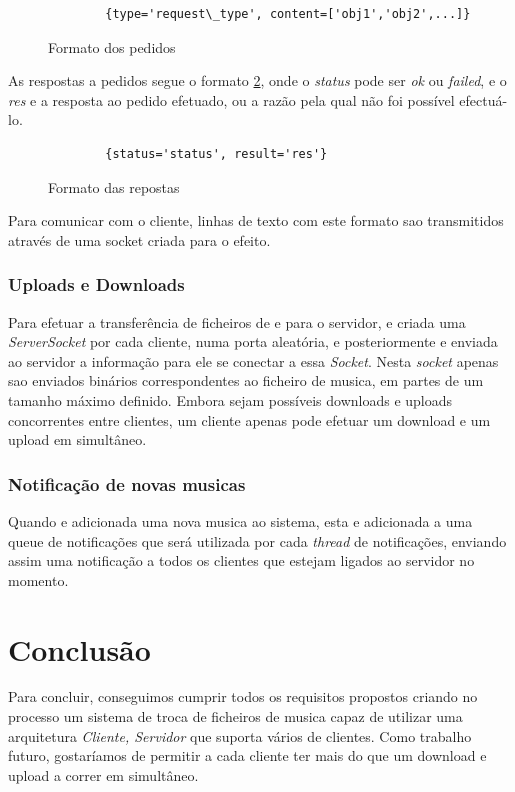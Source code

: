 \documentclass[a4paper]{report}
\begin{document}
\begin{figure}[H]
    \begin{verbatim}
        {type='request\_type', content=['obj1','obj2',...]}
    \end{verbatim}
    \caption{Formato dos pedidos}
    \label{inputformat}
\end{figure}
As respostas a pedidos segue o formato \ref{outputformat}, onde o 
\textit{status} pode ser \textit{ok} ou \textit{failed}, e o \textit{res}
e a resposta ao pedido efetuado, ou a razão pela qual não foi possível 
efectuá-lo.

\begin{figure}[H]
    \begin{verbatim}
        {status='status', result='res'}
    \end{verbatim}
    \caption{Formato das repostas}
    \label{outputformat}
\end{figure}
Para comunicar com o cliente, linhas de texto com este formato sao transmitidos
através de uma socket criada para o efeito.

\subsection{Uploads e Downloads}
Para efetuar a transferência de ficheiros de e para o servidor, e criada uma
\textit{ServerSocket} por cada cliente, numa porta aleatória, e posteriormente
e enviada ao servidor a informação para ele se conectar a essa \textit{Socket}.
Nesta \textit{socket} apenas sao enviados binários correspondentes ao ficheiro
de musica, em partes de um tamanho máximo definido. Embora sejam possíveis
downloads e uploads concorrentes entre clientes, um cliente apenas pode efetuar
um download e um upload em simultâneo.

\subsection{Notificação de novas musicas}
Quando e adicionada uma nova musica ao sistema, esta e adicionada a uma queue de
notificações que será utilizada por cada \textit{thread} de notificações, 
enviando assim uma notificação a todos os clientes que estejam ligados ao
servidor no momento.

\chapter{Conclusão}
Para concluir, conseguimos cumprir todos os requisitos propostos criando no processo um
sistema de troca de ficheiros de musica capaz de utilizar uma arquitetura 
\textit{Cliente, Servidor} que suporta vários de clientes.
Como trabalho futuro, gostaríamos de permitir a cada cliente ter mais do que um
download e upload a correr em simultâneo.
\end{document}
